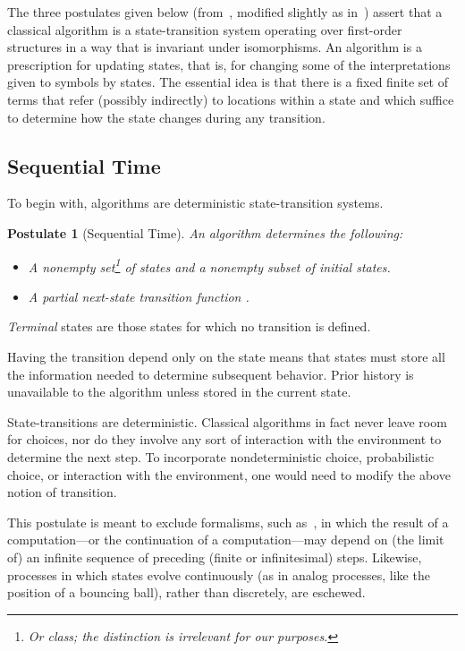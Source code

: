 \documentclass[copyright,creativecommons,english]{eptcs}
\newtheorem{postulate}{Postulate}
\begin{document}
The three postulates given below (from~\cite{Gurevich00}, modified slightly as in~\cite{Ord1,Ord2,Ord3,Exact}) assert that a classical algorithm is a state-transition system operating over first-order structures in a way that is invariant under isomorphisms.
An algorithm is a prescription for updating states, that is, for changing some of the interpretations given to symbols by states.
The essential idea is that there is a fixed finite set of terms that refer (possibly indirectly) to locations within a state
and which suffice to determine how the state changes during any transition.

\subsection{Sequential Time}

To begin with,
algorithms are deterministic state-transition systems.

\begin{postulate}[Sequential Time]\label{P1}
An algorithm determines the following:
\begin{itemize}
\item A nonempty set\/\footnote{Or class; the distinction is irrelevant for our purposes.}
 of \emph{states} and a nonempty subset  of \emph{initial} states.\item A partial \emph{next-state} transition function .
\end{itemize}
\end{postulate}

\emph{Terminal} states  are those states 
for which no transition  is defined.

Having the transition depend only on the state
means that states must store all the information needed to determine subsequent behavior.
Prior history is unavailable to the algorithm unless stored in the current state.

State-transitions are deterministic.
Classical algorithms in fact never leave room
for choices, nor do they involve any sort of interaction with the environment to determine
the next step.
To incorporate nondeterministic choice, probabilistic choice, or interaction with the environment, one
would need to modify the above notion of transition.

This postulate is meant to exclude formalisms, such as~\cite{Gold,Putnam}, 
in which the result of a computation---or the continuation of a computation---may depend
on (the limit of) an infinite sequence of preceding (finite or infinitesimal) steps.
Likewise,
processes in which states evolve continuously (as in analog processes, like the position of a bouncing ball), rather than discretely, are eschewed.
\end{document}
